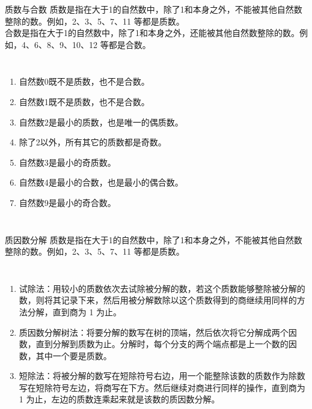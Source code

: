 \documentclass[aspectratio=169]{ctexbeamer} %
\date{\today}
\begin{document}
\begin{frame}[t]{质数与合数}
\alert{质数}是指在\alert{大于1的自然数}中，除了\alert{1和本身}之外，\alert{不能}被其他自然数整除的数。例如，2、3、5、7、11 等都是质数。\\
\alert{合数}是指在\alert{大于1的自然数}中，除了\alert{1和本身}之外，\alert{还能}被其他自然数整除的数。例如，4、6、8、9、10、12 等都是合数。
\begin{columns}
\begin{enumerate}[label={\arabic*.}]
\item 自然数0既\alert{不是质数}，也\alert{不是合数}。 \pause
\item 自然数1既\alert{不是质数}，也\alert{不是合数}。 \pause
\item 自然数2是最小的\alert{质数}，也是唯一的\alert{偶质数}。 \pause
\item \alert{除了2以外}，所有其它的质数都是\alert{奇数}。 \pause
\item 自然数3是最小的\alert{奇质数}。 \pause
\item 自然数4是最小的\alert{合数}，也是最小的\alert{偶合数}。 \pause
\item 自然数9是最小的\alert{奇合数}。
\end{enumerate}
\end{columns}
\end{frame}

\begin{frame}[t]{质因数分解}
\alert{质数}是指在\alert{大于1的自然数}中，除了\alert{1和本身}之外，\alert{不能}被其他自然数整除的数。例如，2、3、5、7、11 等都是质数。
\begin{columns}
\begin{enumerate}[label={\arabic*.}]
\item \alert{试除法：}用较小的质数依次去试除被分解的数，若这个质数能够整除被分解的数，则将其记录下来，然后用被分解数除以这个质数得到的商继续用同样的方法分解，直到商为 1 为止。
\item \alert{质因数分解树法：}将要分解的数写在树的顶端，然后依次将它分解成两个因数，直到分解到质数为止。分解时，每个分支的两个端点都是上一个数的因数，其中一个要是质数。
\item \alert{短除法：}将被分解的数写在短除符号右边，用一个能整除该数的质数作为除数写在短除符号左边，将商写在下方。然后继续对商进行同样的操作，直到商为 1 为止，左边的质数连乘起来就是该数的质因数分解。

\end{enumerate}
\end{columns}
\end{frame}
\end{document}
